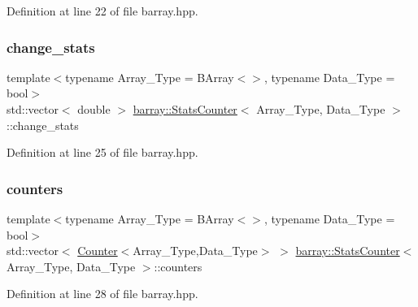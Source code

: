 Definition at line 22 of file barray.\+hpp.

\mbox{\label{classbarray_1_1_stats_counter_a36e139e694c81d9e2b7c07d816959b9d}} 
\subsubsection{\texorpdfstring{change\+\_\+stats}{change\_stats}}
{\footnotesize\ttfamily template$<$typename Array\+\_\+\+Type  = B\+Array$<$$>$, typename Data\+\_\+\+Type  = bool$>$ \\
std\+::vector$<$ double $>$ \hyperlink{classbarray_1_1_stats_counter}{barray\+::\+Stats\+Counter}$<$ Array\+\_\+\+Type, Data\+\_\+\+Type $>$\+::change\+\_\+stats}



Definition at line 25 of file barray.\+hpp.

\mbox{\label{classbarray_1_1_stats_counter_ad2da838a6b8235395c7c5b9c58d1c780}} 
\subsubsection{\texorpdfstring{counters}{counters}}
{\footnotesize\ttfamily template$<$typename Array\+\_\+\+Type  = B\+Array$<$$>$, typename Data\+\_\+\+Type  = bool$>$ \\
std\+::vector$<$ \hyperlink{classbarray_1_1_counter}{Counter}$<$Array\+\_\+\+Type,Data\+\_\+\+Type$>$ $>$ \hyperlink{classbarray_1_1_stats_counter}{barray\+::\+Stats\+Counter}$<$ Array\+\_\+\+Type, Data\+\_\+\+Type $>$\+::counters}



Definition at line 28 of file barray.\+hpp.

\mbox{\label{classbarray_1_1_stats_counter_ac9472b6f14107c97555d912bd92547f1}} 
